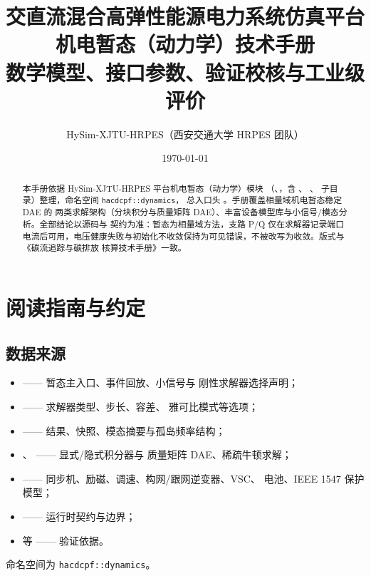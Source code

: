 \documentclass[UTF8,fontset=fandol,a4paper,11pt]{ctexart}
\title{\textbf{交直流混合高弹性能源电力系统仿真平台}\\[0.5em]
       {\Large 机电暂态（动力学）技术手册}\\[0.3em]
       {\large 数学模型、接口参数、验证校核与工业级评价}}
\author{HySim-XJTU-HRPES（西安交通大学 HRPES 团队）}
\date{\today}
\begin{document}
\maketitle
\begin{abstract}
\noindent 本手册依据 HySim-XJTU-HRPES 平台机电暂态（动力学）模块
（、，含 、
、 子目录）整理，命名空间 \texttt{hacdcpf::dynamics}，
总入口头 。手册覆盖相量域机电暂态稳定 DAE 的
两类求解架构（分块积分与质量矩阵 DAE）、丰富设备模型库与小信号/模态分析。全部结论以源码与
 契约为准：暂态为相量域方法，支路 P/Q 仅在求解器记录端口
电流后可用，电压健康失败与初始化不收敛保持为可见错误，不被改写为收敛。版式与《碳流追踪与碳排放
核算技术手册》一致。
\end{abstract}

\tableofcontents
\newpage

\section{阅读指南与约定}
\subsection{数据来源}
\begin{itemize}
  \item {} —— 暂态主入口、事件回放、小信号与
        刚性求解器选择声明；
  \item {} —— 求解器类型、步长、容差、
        雅可比模式等选项；
  \item {} —— 结果、快照、模态摘要与孤岛频率结构；
  \item {}、 —— 显式/隐式积分器与
        质量矩阵 DAE、稀疏牛顿求解；
  \item {} —— 同步机、励磁、调速、构网/跟网逆变器、VSC、
        电池、IEEE 1547 保护模型；
  \item {} —— 运行时契约与边界；
  \item {} 等 —— 验证依据。
\end{itemize}
命名空间为 \texttt{hacdcpf::dynamics}。
\end{document}

